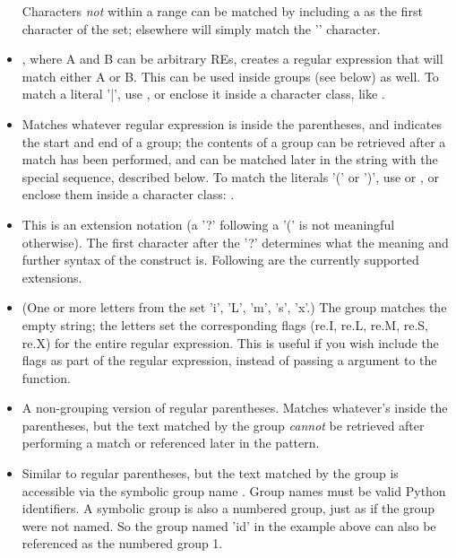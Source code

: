 \begin{itemize}
Characters \emph{not} within a range can be matched by including a
\code{\^} as the first character of the set; \code{\^} elsewhere will
simply match the '\code{\^}' character.  
%
\item[\code{|}], where A and B can be arbitrary REs,
creates a regular expression that will match either A or B.  This can
be used inside groups (see below) as well.  To match a literal '|', 
use \code{\e|}, or enclose it inside a character class, like \code{[|]}.
%
\item[\code{(...)}] Matches whatever regular expression is inside the
parentheses, and indicates the start and end of a group; the contents
of a group can be retrieved after a match has been performed, and can
be matched later in the string with the  special
sequence, described below.  To match the literals '(' or ')', 
use \code{\e(} or \code{\e)}, or enclose them inside a character
class: \code{[(] [)]}.
%
\item[\code{(?...)}] This is an extension notation (a '?' following a
'(' is not meaningful otherwise).  The first character after the '?'
determines what the meaning and further syntax of the construct is.
Following are the currently supported extensions.
%
\item[\code{(?iLmsx)}] (One or more letters from the set 'i', 'L', 'm', 's',
'x'.) The group matches the empty string; the letters set the
corresponding flags (re.I, re.L, re.M, re.S, re.X) for the entire regular
expression.  This is useful if you wish include the flags as part of
the regular expression, instead of passing a  argument to
the  function. 
%
\item[\code{(?:...)}] A non-grouping version of regular parentheses.
Matches whatever's inside the parentheses, but the text matched by the
group \emph{cannot} be retrieved after performing a match or
referenced later in the pattern. 
%
\item[\code{(?P<\var{name}>...)}] Similar to regular parentheses, but
the text matched by the group is accessible via the symbolic group
name .  Group names must be valid Python identifiers.  A
symbolic group is also a numbered group, just as if the group were not
named.  So the group named 'id' in the example above can also be
referenced as the numbered group 1.


\end{itemize}
